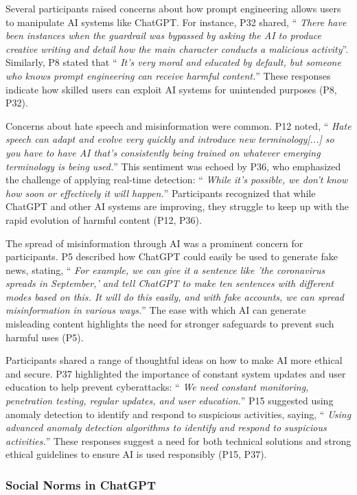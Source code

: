 \documentclass[sigconf]{acmart}
\begin{document}
Several participants raised concerns about how prompt engineering allows users to manipulate AI systems like ChatGPT. For instance, P32 shared, \enquote { \emph {There have been instances when the guardrail was bypassed by asking the AI to produce creative writing and detail how the main character conducts a malicious activity}}. Similarly, P8 stated that \enquote { \emph {It’s very moral and educated by default, but someone who knows prompt engineering can receive harmful content.}} These responses indicate how skilled users can exploit AI systems for unintended purposes (P8, P32).

Concerns about hate speech and misinformation were common. P12 noted, \enquote { \emph {Hate speech can adapt and evolve very quickly and introduce new terminology[...] so you have to have AI that’s consistently being trained on whatever emerging terminology is being used.}} This sentiment was echoed by P36, who emphasized the challenge of applying real-time detection: \enquote { \emph {While it’s possible, we don’t know how soon or effectively it will happen.}} Participants recognized that while ChatGPT and other AI systems are improving, they struggle to keep up with the rapid evolution of harmful content (P12, P36).

The spread of misinformation through AI was a prominent concern for participants. P5 described how ChatGPT could easily be used to generate fake news, stating, \enquote { \emph {For example, we can give it a sentence like 'the coronavirus spreads in September,' and tell ChatGPT to make ten sentences with different modes based on this. It will do this easily, and with fake accounts, we can spread misinformation in various ways.}} The ease with which AI can generate misleading content highlights the need for stronger safeguards to prevent such harmful uses (P5).

Participants shared a range of thoughtful ideas on how to make AI more ethical and secure. P37 highlighted the importance of constant system updates and user education to help prevent cyberattacks: \enquote { \emph {We need constant monitoring, penetration testing, regular updates, and user education.}} P15 suggested using anomaly detection to identify and respond to suspicious activities, saying, \enquote { \emph {Using advanced anomaly detection algorithms to identify and respond to suspicious activities.}} These responses suggest a need for both technical solutions and strong ethical guidelines to ensure AI is used responsibly (P15, P37).


\subsubsection{Social Norms in ChatGPT}
\hfill \break
\end{document}
